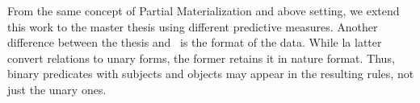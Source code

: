 From the same concept of Partial Materialization and above setting, we extend this work to the master thesis using different predictive measures. Another difference between the thesis and~\cite{ref12} is the format of the data. While la latter convert relations to unary forms, the former retains it in nature format. Thus, binary predicates with subjects and objects may appear in the resulting rules, not just the unary ones.

%
%
%
%
